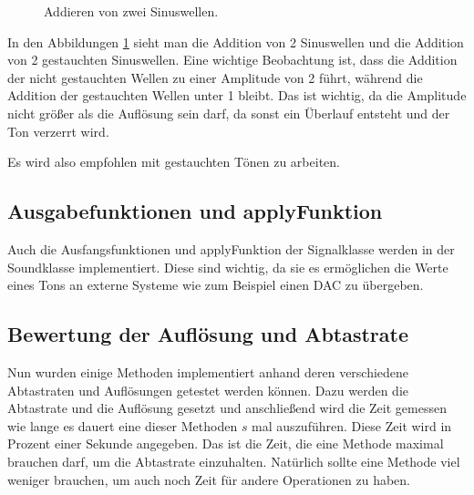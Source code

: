\begin{figure}[h]
\begin{tikzpicture}
    \end{tikzpicture}

    \caption{Addieren von zwei Sinuswellen.}
    \label{fig:addition_and_multiplication}

\end{figure}

In den Abbildungen \ref{fig:addition_and_multiplication} sieht man die 
Addition von 2 Sinuswellen und die Addition von 2 gestauchten Sinuswellen.
Eine wichtige Beobachtung ist, dass die Addition der nicht gestauchten Wellen
zu einer Amplitude von 2 führt, während die Addition der gestauchten Wellen
unter 1 bleibt. Das ist wichtig, da die Amplitude nicht größer als die Auflösung
sein darf, da sonst ein Überlauf entsteht und der Ton verzerrt wird.

Es wird also empfohlen mit gestauchten Tönen zu arbeiten.

\subsection{Ausgabefunktionen und applyFunktion}

Auch die Ausfangsfunktionen und applyFunktion der Signalklasse werden in der Soundklasse
implementiert. Diese sind wichtig, da sie es ermöglichen die Werte eines Tons 
an externe Systeme wie zum Beispiel einen DAC zu übergeben.

\subsection{Bewertung der Auflösung und Abtastrate}
\label{chap:Bewertung_der_Auflösung_und_Abtastrate}

Nun wurden einige Methoden implementiert anhand deren verschiedene 
Abtastraten und Auflösungen getestet werden können. Dazu werden die 
Abtastrate und die Auflösung gesetzt und anschließend wird die Zeit gemessen
wie lange es dauert eine dieser Methoden $s$ mal auszuführen. Diese Zeit wird in
Prozent einer Sekunde angegeben. Das ist die Zeit, die eine Methode maximal
brauchen darf, um die Abtastrate einzuhalten. Natürlich sollte eine Methode viel 
weniger brauchen, um auch noch Zeit für andere Operationen zu haben.

